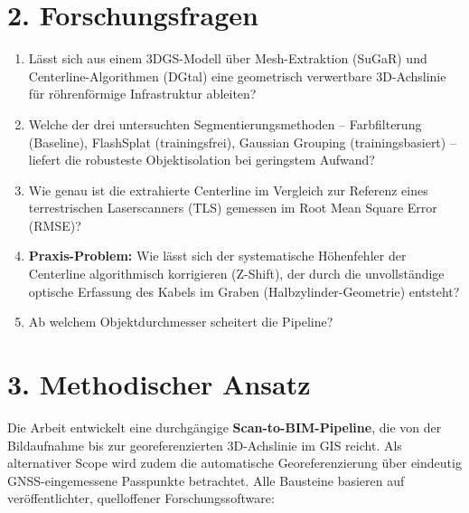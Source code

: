 \documentclass[11pt, a4paper]{article}
\begin{document}
\section{2. Forschungsfragen}

\begin{enumerate}[noitemsep, leftmargin=1.5em]
    \item L\"asst sich aus einem 3DGS-Modell \"uber Mesh-Extraktion (SuGaR) und Centerline-Algorithmen (DGtal) eine geometrisch verwertbare 3D-Achslinie f\"ur r\"ohrenf\"ormige Infrastruktur ableiten?
    \item Welche der drei untersuchten Segmentierungsmethoden -- Farbfilterung (Baseline), FlashSplat (trainingsfrei), Gaussian Grouping (trainingsbasiert) -- liefert die robusteste Objektisolation bei geringstem Aufwand?
    \item Wie genau ist die extrahierte Centerline im Vergleich zur Referenz eines terrestrischen Laserscanners (TLS) gemessen im Root Mean Square Error (RMSE)?
    \item \textbf{Praxis-Problem:} Wie l\"asst sich der systematische H\"ohenfehler der Centerline algorithmisch korrigieren (Z-Shift), der durch die unvollst\"andige optische Erfassung des Kabels im Graben (Halbzylinder-Geometrie) entsteht?
    \item Ab welchem Objektdurchmesser scheitert die Pipeline?
\end{enumerate}

\section{3. Methodischer Ansatz}

Die Arbeit entwickelt eine durchg\"angige \textbf{Scan-to-BIM-Pipeline}, die von der Bildaufnahme bis zur georeferenzierten 3D-Achslinie im GIS reicht. Als alternativer Scope wird zudem die automatische Georeferenzierung \"uber eindeutig GNSS-eingemessene Passpunkte betrachtet. Alle Bausteine basieren auf ver\"offentlichter, quelloffener Forschungssoftware:
\end{document}

